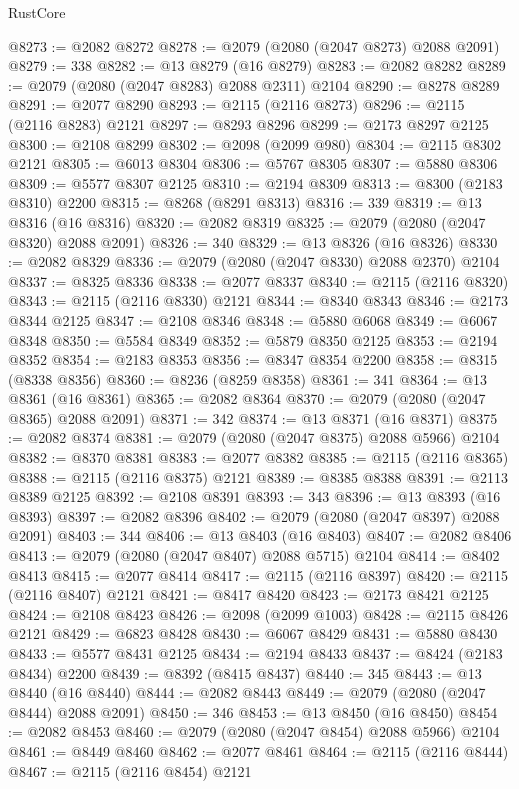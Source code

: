 \begin{lexlean}{RustCore}
\begin{coremodule}
@8273 := @2082 @8272
@8278 := @2079 (@2080 (@2047 @8273) @2088 @2091)
@8279 := 338
@8282 := @13 @8279 (@16 @8279)
@8283 := @2082 @8282
@8289 := @2079 (@2080 (@2047 @8283) @2088 @2311) @2104
@8290 := @8278 @8289
@8291 := @2077 @8290
@8293 := @2115 (@2116 @8273)
@8296 := @2115 (@2116 @8283) @2121
@8297 := @8293 @8296
@8299 := @2173 @8297 @2125
@8300 := @2108 @8299
@8302 := @2098 (@2099 @980)
@8304 := @2115 @8302 @2121
@8305 := @6013 @8304
@8306 := @5767 @8305
@8307 := @5880 @8306
@8309 := @5577 @8307 @2125
@8310 := @2194 @8309
@8313 := @8300 (@2183 @8310) @2200
@8315 := @8268 (@8291 @8313)
@8316 := 339
@8319 := @13 @8316 (@16 @8316)
@8320 := @2082 @8319
@8325 := @2079 (@2080 (@2047 @8320) @2088 @2091)
@8326 := 340
@8329 := @13 @8326 (@16 @8326)
@8330 := @2082 @8329
@8336 := @2079 (@2080 (@2047 @8330) @2088 @2370) @2104
@8337 := @8325 @8336
@8338 := @2077 @8337
@8340 := @2115 (@2116 @8320)
@8343 := @2115 (@2116 @8330) @2121
@8344 := @8340 @8343
@8346 := @2173 @8344 @2125
@8347 := @2108 @8346
@8348 := @5880 @6068
@8349 := @6067 @8348
@8350 := @5584 @8349
@8352 := @5879 @8350 @2125
@8353 := @2194 @8352
@8354 := @2183 @8353
@8356 := @8347 @8354 @2200
@8358 := @8315 (@8338 @8356)
@8360 := @8236 (@8259 @8358)
@8361 := 341
@8364 := @13 @8361 (@16 @8361)
@8365 := @2082 @8364
@8370 := @2079 (@2080 (@2047 @8365) @2088 @2091)
@8371 := 342
@8374 := @13 @8371 (@16 @8371)
@8375 := @2082 @8374
@8381 := @2079 (@2080 (@2047 @8375) @2088 @5966) @2104
@8382 := @8370 @8381
@8383 := @2077 @8382
@8385 := @2115 (@2116 @8365)
@8388 := @2115 (@2116 @8375) @2121
@8389 := @8385 @8388
@8391 := @2113 @8389 @2125
@8392 := @2108 @8391
@8393 := 343
@8396 := @13 @8393 (@16 @8393)
@8397 := @2082 @8396
@8402 := @2079 (@2080 (@2047 @8397) @2088 @2091)
@8403 := 344
@8406 := @13 @8403 (@16 @8403)
@8407 := @2082 @8406
@8413 := @2079 (@2080 (@2047 @8407) @2088 @5715) @2104
@8414 := @8402 @8413
@8415 := @2077 @8414
@8417 := @2115 (@2116 @8397)
@8420 := @2115 (@2116 @8407) @2121
@8421 := @8417 @8420
@8423 := @2173 @8421 @2125
@8424 := @2108 @8423
@8426 := @2098 (@2099 @1003)
@8428 := @2115 @8426 @2121
@8429 := @6823 @8428
@8430 := @6067 @8429
@8431 := @5880 @8430
@8433 := @5577 @8431 @2125
@8434 := @2194 @8433
@8437 := @8424 (@2183 @8434) @2200
@8439 := @8392 (@8415 @8437)
@8440 := 345
@8443 := @13 @8440 (@16 @8440)
@8444 := @2082 @8443
@8449 := @2079 (@2080 (@2047 @8444) @2088 @2091)
@8450 := 346
@8453 := @13 @8450 (@16 @8450)
@8454 := @2082 @8453
@8460 := @2079 (@2080 (@2047 @8454) @2088 @5966) @2104
@8461 := @8449 @8460
@8462 := @2077 @8461
@8464 := @2115 (@2116 @8444)
@8467 := @2115 (@2116 @8454) @2121

\end{coremodule}
\end{lexlean}

